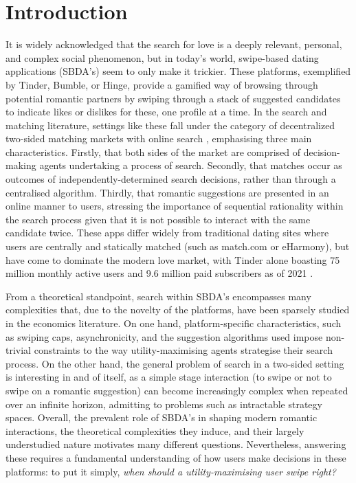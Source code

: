 \section{Introduction}
\label{sec:section1} 

It is widely acknowledged that the search for love is a deeply relevant, personal, and complex social phenomenon, but in today's world, swipe-based dating applications (SBDA's) seem to only make it trickier. 
These platforms, exemplified by Tinder, Bumble, or Hinge, provide a gamified way of browsing through potential romantic partners by swiping through a stack of suggested candidates to indicate likes or dislikes for these, one profile at a time. 
In the search and matching literature, settings like these fall under the category of decentralized two-sided matching markets with online search \citep{kanoria2021facilitating}, emphasising three main characteristics. 
Firstly, that both sides of the market are comprised of decision-making agents undertaking a process of search. 
Secondly, that matches occur as outcomes of independently-determined search decisions, rather than through a centralised algorithm. Thirdly, that romantic suggestions are presented in an online manner to users, stressing the importance of sequential rationality within the search process given that it is not possible to interact with the same candidate twice. 
These apps differ widely from traditional dating sites where users are centrally and statically matched (such as match.com or eHarmony), but have come to dominate the modern love market, with Tinder alone boasting 75 million monthly active users and 9.6 million paid subscribers as of 2021 \citep{web:tinder_stats}.


From a theoretical standpoint, search within SBDA's encompasses many complexities that, due to the novelty of the platforms, have been sparsely studied in the economics literature. 
On one hand, platform-specific characteristics, such as swiping caps, asynchronicity, and the suggestion algorithms used impose non-trivial constraints to the way utility-maximising agents strategise their search process.
On the other hand, the general problem of search in a two-sided setting is interesting in and of itself, as a simple stage interaction (to swipe or not to swipe on a romantic suggestion) can become increasingly complex when repeated over an infinite horizon, admitting to problems such as intractable strategy spaces. 
Overall, the prevalent role of SBDA's in shaping modern romantic interactions, the theoretical complexities they induce, and their largely understudied nature motivates many different questions. 
Nevertheless, answering these requires a fundamental understanding of how users make decisions in these platforms: to put it simply, \textit{when should a utility-maximising user swipe right?} 


